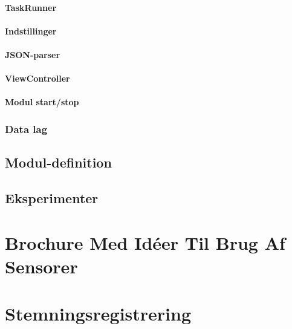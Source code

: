 \subsubsection{TaskRunner}
\subsubsection{Indstillinger}

\subsubsection{JSON-parser}
\subsubsection{ViewController} %
\subsubsection{Modul start/stop} %

\subsection{Data lag}


\section{Modul-definition}\label{modul_definition}


\section{Eksperimenter}




\label{bib:mybiblio}

\appendix


\chapter{Brochure Med Idéer Til Brug Af Sensorer}\label{app:brochure}
 

\chapter{Stemningsregistrering}


